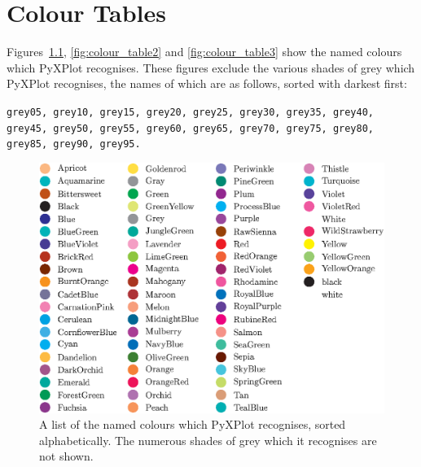 %
%
%
%
%



\chapter{Colour Tables}
\label{ch:colour_charts}

 Figures~\ref{fig:colour_table1}, \ref{fig:colour_table2}
and \ref{fig:colour_table3} show the named colours which PyXPlot recognises.
These figures exclude the various shades of grey which PyXPlot recognises, the
names of which are as follows, sorted with darkest first:

\vspace{5mm}\noindent
{}
{\tt grey05, grey10, grey15, grey20, grey25, grey30, grey35, grey40, grey45, grey50, grey55, grey60, grey65, grey70, grey75, grey80, grey85, grey90, grey95.}

\begin{figure}
\begin{center}
\includegraphics[width=\textwidth]{figures/pyx_colours2.eps}
\end{center}
\caption[A list of the named colours which PyXPlot recognises, sorted alphabetically]
{A list of the named colours which PyXPlot recognises, sorted alphabetically. The numerous shades of grey which it recognises are not shown.}
\label{fig:colour_table1}
\end{figure}

